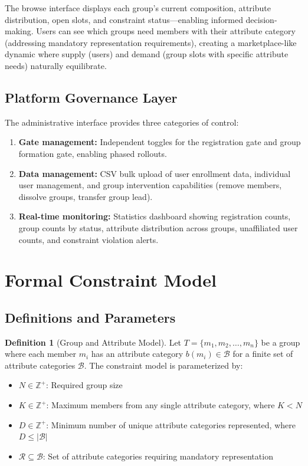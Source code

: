 \documentclass[11pt,a4paper]{article}
\theoremstyle{plain}
\theoremstyle{definition}
\newtheorem{definition}[theorem]{Definition}
\begin{document}
The browse interface displays each group's current composition, attribute distribution, open slots, and constraint status---enabling informed decision-making. Users can see which groups need members with their attribute category (addressing mandatory representation requirements), creating a marketplace-like dynamic where supply (users) and demand (group slots with specific attribute needs) naturally equilibrate.

\subsection{Platform Governance Layer}

The administrative interface provides three categories of control:
\begin{enumerate}[noitemsep,topsep=4pt]
    \item \textbf{Gate management:} Independent toggles for the registration gate and group formation gate, enabling phased rollouts.
    \item \textbf{Data management:} CSV bulk upload of user enrollment data, individual user management, and group intervention capabilities (remove members, dissolve groups, transfer group lead).
    \item \textbf{Real-time monitoring:} Statistics dashboard showing registration counts, group counts by status, attribute distribution across groups, unaffiliated user counts, and constraint violation alerts.
\end{enumerate}

\section{Formal Constraint Model}
\label{sec:constraints}

\subsection{Definitions and Parameters}

\begin{definition}[Group and Attribute Model]
Let $T = \{m_1, m_2, \ldots, m_n\}$ be a group where each member $m_i$ has an attribute category $b(m_i) \in \mathcal{B}$ for a finite set of attribute categories $\mathcal{B}$. The constraint model is parameterized by:
\begin{itemize}[noitemsep,topsep=3pt]
    \item $N \in \mathbb{Z}^+$: Required group size
    \item $K \in \mathbb{Z}^+$: Maximum members from any single attribute category, where $K < N$
    \item $D \in \mathbb{Z}^+$: Minimum number of unique attribute categories represented, where $D \leq |\mathcal{B}|$
    \item $\mathcal{R} \subseteq \mathcal{B}$: Set of attribute categories requiring mandatory representation
\end{itemize}
\end{definition}
\end{document}
